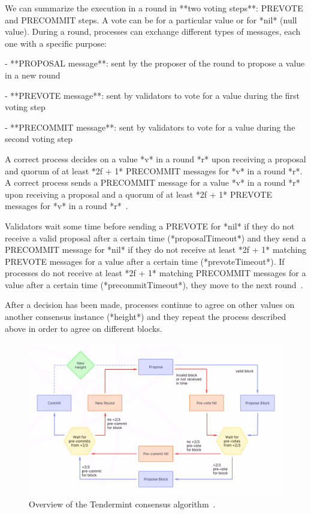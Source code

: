 \documentclass[a4paper,11pt,oneside]{report}
\begin{document}
\begin{markdown}
We can summarize the execution in a round in **two voting steps**: PREVOTE and PRECOMMIT steps. A vote can be for a particular value or for *nil* (null value). During a round, processes can exchange different types of messages, each one with a specific purpose:
 
- **PROPOSAL message**: sent by the proposer of the round to propose a value in a new round

- **PREVOTE message**: sent by validators to vote for a value during the first voting step

- **PRECOMMIT message**: sent by validators to vote for a value during the second voting step

A correct process decides on a value *v* in a round *r* upon receiving a proposal and quorum of at least *2f + 1* PRECOMMIT messages for *v* in a round *r*. 
A correct process sends a PRECOMMIT message for a value *v* in a round *r* upon receiving a proposal and a quorum of at least *2f + 1* PREVOTE messages for *v* in a round *r*~\cite{buchman2018latest}.

Validators wait some time before sending a PREVOTE for *nil* if they do not receive a valid proposal after a certain time (*proposalTimeout*) and they send a PRECOMMIT message for *nil* if they do not receive at least *2f + 1* matching PREVOTE messages for a value after a certain time (*prevoteTimeout*).
If processes do not receive at least *2f + 1* matching PRECOMMIT messages for a value after a certain time (*precommitTimeout*), they move to the next round~\cite{tendermint-overview}.

After a decision has been made, processes continue to agree on other values on another consensus instance (*height*) and they repeat the process described above in order to agree on different blocks.

\end{markdown}

\begin{figure}[h]
\centering
\includegraphics[scale=0.45]{tendermint_schema.png} 
\caption{Overview of the Tendermint consensus algorithm~\cite{tendermint-schema}.}
\label{fig:subim1}
\end{figure}
\end{document}
